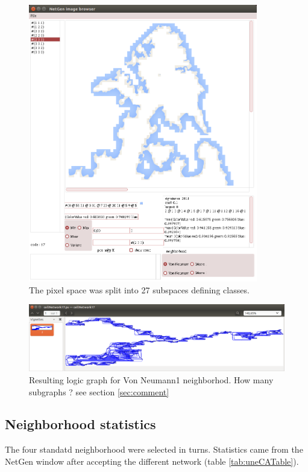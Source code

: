 \begin{figure}[hbtp]
\begin{center} 
\includegraphics[width=10cm]{diego-class17-3.png}
\caption{The pixel  space was split into 27 subspaces  defining classes.}
\label{fig:antisrananaClass17}
\end{center}
\end{figure}


\begin{figure}[hbtp]
\begin{center} 
\includegraphics[width=12cm]{diegoGraph17.png}
\caption{Resulting   logic  graph for Von Neumann1 neighborhod.  How many subgraphs  ? see section \ref{sec:comment} }
\label{fig:ansirananaGraph}
\end{center}
\end{figure}

\subsection{ Neighborhood statistics}

The four standatd neighborhood were selected in turns. Statistics came from the NetGen window
after accepting the different network (table \ref{tab:uneCATable}).


